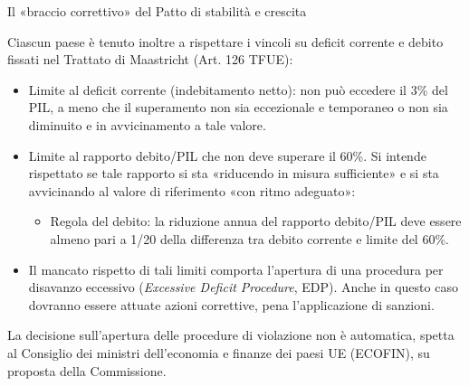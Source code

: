 \documentclass[aspectratio=149,11pt,italian]{beamer}
\begin{document}
\begin{frame}{Il «braccio correttivo» del Patto di stabilità e crescita}

  Ciascun paese è tenuto inoltre a rispettare i vincoli su deficit corrente e
  debito fissati nel Trattato di Maastricht (Art. 126 TFUE):
  \begin{itemize}
  \item \alert{Limite al deficit corrente} (indebitamento netto): non può
    eccedere il 3\% del PIL, a meno che il superamento non sia eccezionale e
    temporaneo o non sia diminuito e in avvicinamento a tale valore.
  \item \alert{Limite al rapporto debito/PIL} che non deve superare il
    60\%. Si intende rispettato se tale rapporto si sta «riducendo in misura
    sufficiente» e si sta avvicinando al valore di riferimento «con ritmo
    adeguato»:
    \begin{itemize}
    \item \alert{Regola del debito}: la riduzione annua del rapporto
      debito/PIL deve essere almeno pari a 1/20 della differenza tra debito
      corrente e limite del 60\%.
    \end{itemize}
  \item Il mancato rispetto di tali limiti comporta l'apertura di una
    \alert{procedura per disavanzo eccessivo} (\emph{Excessive Deficit
      Procedure}, EDP). Anche in questo caso dovranno essere attuate azioni
    correttive, pena l'applicazione di sanzioni.
  \end{itemize}
  \begin{block}{}
    \small La decisione sull'apertura delle procedure di violazione non è
    automatica, spetta al Consiglio dei ministri dell'economia e finanze dei
    paesi UE (ECOFIN), su proposta della Commissione.
  \end{block}
\end{frame}
\end{document}
